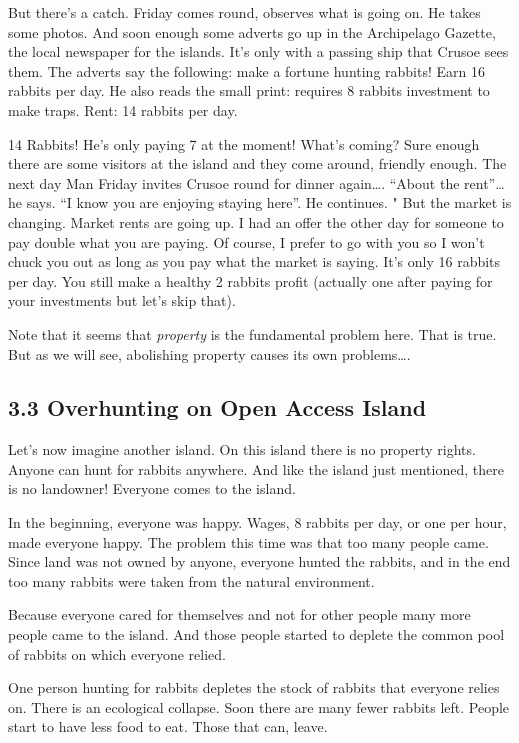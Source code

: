 \documentclass[]{tufte-handout}
\begin{document}
But there's a catch. Friday comes round, observes what is going on. He
takes some photos. And soon enough some adverts go up in the Archipelago
Gazette, the local newspaper for the islands. It's only with a passing
ship that Crusoe sees them. The adverts say the following: make a
fortune hunting rabbits! Earn 16 rabbits per day. He also reads the
small print: requires 8 rabbits investment to make traps. Rent: 14
rabbits per day.

14 Rabbits! He's only paying 7 at the moment! What's coming? Sure enough
there are some visitors at the island and they come around, friendly
enough. The next day Man Friday invites Crusoe round for dinner
again\ldots{}. ``About the rent''\ldots{} he says. ``I know you are
enjoying staying here''. He continues. " But the market is changing.
Market rents are going up. I had an offer the other day for someone to
pay double what you are paying. Of course, I prefer to go with you so I
won't chuck you out as long as you pay what the market is saying. It's
only 16 rabbits per day. You still make a healthy 2 rabbits profit
(actually one after paying for your investments but let's skip that).

Note that it seems that \emph{property} is the fundamental problem here.
That is true. But as we will see, abolishing property causes its own
problems\ldots{}.

\hypertarget{overhunting-on-open-access-island}{%
\subsection{3.3 Overhunting on Open Access
Island}\label{overhunting-on-open-access-island}}

Let's now imagine another island. On this island there is no property
rights. Anyone can hunt for rabbits anywhere. And like the island just
mentioned, there is no landowner! Everyone comes to the island.

In the beginning, everyone was happy. Wages, 8 rabbits per day, or one
per hour, made everyone happy. The problem this time was that too many
people came. Since land was not owned by anyone, everyone hunted the
rabbits, and in the end too many rabbits were taken from the natural
environment.

Because everyone cared for themselves and not for other people many more
people came to the island. And those people started to deplete the
common pool of rabbits on which everyone relied.

One person hunting for rabbits depletes the stock of rabbits that
everyone relies on. There is an ecological collapse. Soon there are many
fewer rabbits left. People start to have less food to eat. Those that
can, leave.
\end{document}
